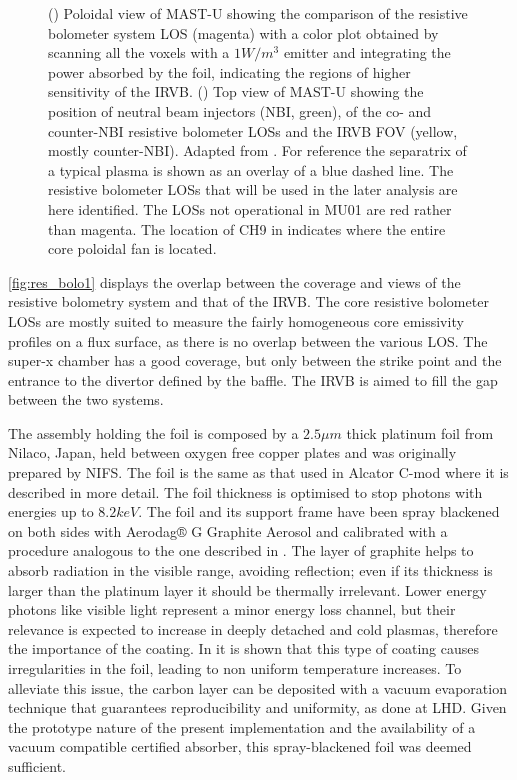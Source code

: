 \begin{figure}[!ht]
\begin{subfigure}{0.48\linewidth}
         \caption{}
         \label{fig:res_bolo1b}
     \end{subfigure}
	\caption{() Poloidal view of MAST-U showing the comparison of the resistive bolometer system LOS (magenta) with a color plot obtained by scanning all the voxels with a $1W/m^3$ emitter and integrating the power absorbed by the foil, indicating the regions of higher sensitivity of the IRVB. () Top view of MAST-U showing the position of neutral beam injectors (NBI, green), of the co- and counter-NBI resistive bolometer LOSs and the IRVB FOV (yellow, mostly counter-NBI). Adapted from \cite{Rivero-Rodriguez2018}. For reference the separatrix of a typical plasma is shown as an overlay of a blue dashed line. The resistive bolometer LOSs that will be used in the later analysis are here identified. The LOSs not operational in MU01 are red rather than magenta. The location of CH9 in  indicates where the entire core poloidal fan is located.}
    \label{fig:res_bolo1}
\end{figure}


\autoref{fig:res_bolo1} displays the overlap between the coverage and views of the resistive bolometry system and that of the IRVB. The core resistive bolometer LOSs are mostly suited to measure the fairly homogeneous core emissivity profiles on a flux surface, as there is no overlap between the various LOS. The super-x chamber has a good coverage, but only between the  strike point and the entrance to the divertor defined by the baffle. The IRVB is aimed to fill the gap between the two systems.

The assembly holding the foil is composed by a $2.5\mu m$ thick platinum foil from Nilaco, Japan, held between oxygen free copper plates and was originally prepared by NIFS. The foil is the same as that used in Alcator C-mod\cite{Reinke2018a} where it is described in more detail. The foil thickness is optimised to stop photons with energies up to $8.2keV$. \cite{PETERSON2010,Gullikson2022} The foil and its support frame have been spray blackened on both sides with Aerodag® G Graphite Aerosol and calibrated with a procedure analogous to the one described in \cite{Itomi2014}. The layer of graphite helps to absorb radiation in the visible range, avoiding reflection; even if its thickness is larger than the platinum layer\cite{Pandya2014} it should be thermally irrelevant. \cite{VanEden2018} Lower energy photons like visible light represent a minor energy loss channel, but their relevance is expected to increase in deeply detached and cold plasmas, therefore the importance of the coating.\cite{Havlickova2015a} In \cite{Mukai2016} it is shown that this type of coating causes irregularities in the foil, leading to non uniform temperature increases. To alleviate this issue, the carbon layer can be deposited with a vacuum evaporation technique that guarantees reproducibility and uniformity, as done at LHD. \cite{Mukai2016} Given the prototype nature of the present implementation and the availability of a vacuum compatible certified absorber, this spray-blackened foil was deemed sufficient.

